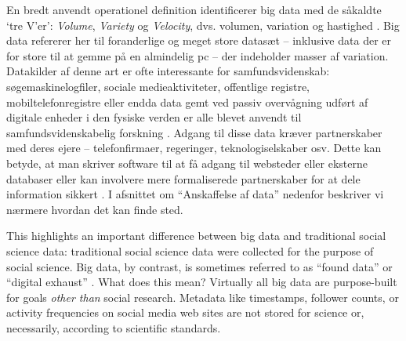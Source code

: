 \documentclass[12pt,]{article}
\begin{document}
En bredt anvendt operationel definition identificerer big data med de
såkaldte `tre V'er': \emph{Volume}, \emph{Variety} og \emph{Velocity},
dvs. volumen, variation og hastighed \citep{laney01}. Big data refererer
her til foranderlige og meget store datasæt -- inklusive data der er for
store til at gemme på en almindelig pc -- der indeholder masser af
variation. Datakilder af denne art er ofte interessante for
samfundsvidenskab: søgemaskinelogfiler, sociale medieaktiviteter,
offentlige registre, mobiltelefonregistre eller endda data gemt ved
passiv overvågning udført af digitale enheder i den fysiske verden er
alle blevet anvendt til samfundsvidenskabelig forskning
\citep{salganik17}. Adgang til disse data kræver partnerskaber med deres
ejere -- telefonfirmaer, regeringer, teknologiselskaber osv. Dette kan
betyde, at man skriver software til at få adgang til websteder eller
eksterne databaser eller kan involvere mere formaliserede partnerskaber
for at dele information sikkert \citep{EL14}. I afsnittet om
``Anskaffelse af data'' nedenfor beskriver vi nærmere hvordan det kan
finde sted.

This highlights an important difference between big data and traditional
social science data: traditional social science data were collected for
the purpose of social science. Big data, by contrast, is sometimes
referred to as ``found data'' or ``digital exhaust'' \citep{harford14}.
What does this mean? Virtually all big data are purpose-built for goals
\emph{other than} social research. Metadata like timestamps, follower
counts, or activity frequencies on social media web sites are not stored
for science or, necessarily, according to scientific standards.
\end{document}
